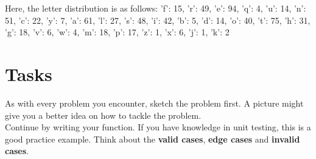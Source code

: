 \documentclass{article}
\begin{document}
\noindent Here, the letter distribution is as follows:
'f': 15, 'r': 49, 'e': 94, 'q': 4, 'u': 14, 'n': 51, 'c': 22, 'y': 7, 'a': 61, 'l': 27, 's': 48, 'i': 42, 'b': 5, 'd': 14, 'o': 40, 't': 75, 'h': 31, 'g': 18, 'v': 6, 'w': 4, 'm': 18, 'p': 17, 'z': 1, 'x': 6, 'j': 1, 'k': 2

\section{Tasks}
As with every problem you encounter, sketch the problem first. A picture might give you a better idea on how to
tackle the problem. \\

Continue by writing your function. If you have knowledge in unit testing, this is a good 
practice example. Think about the \textbf{valid cases}, \textbf{edge cases} and \textbf{invalid cases}. 
\end{document}
